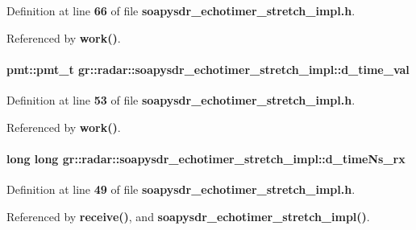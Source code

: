 Definition at line {\bf 66} of file {\bf soapysdr\+\_\+echotimer\+\_\+stretch\+\_\+impl.\+h}.



Referenced by {\bf work()}.

\paragraph[{d\+\_\+time\+\_\+val}]{\setlength{\rightskip}{0pt plus 5cm}pmt\+::pmt\+\_\+t gr\+::radar\+::soapysdr\+\_\+echotimer\+\_\+stretch\+\_\+impl\+::d\+\_\+time\+\_\+val\hspace{0.3cm}{\ttfamily [private]}}\label{classgr_1_1radar_1_1soapysdr__echotimer__stretch__impl_aaed45138f620b093a0f0569e5e1b20b2}


Definition at line {\bf 53} of file {\bf soapysdr\+\_\+echotimer\+\_\+stretch\+\_\+impl.\+h}.



Referenced by {\bf work()}.

\paragraph[{d\+\_\+time\+Ns\+\_\+rx}]{\setlength{\rightskip}{0pt plus 5cm}long long gr\+::radar\+::soapysdr\+\_\+echotimer\+\_\+stretch\+\_\+impl\+::d\+\_\+time\+Ns\+\_\+rx\hspace{0.3cm}{\ttfamily [private]}}\label{classgr_1_1radar_1_1soapysdr__echotimer__stretch__impl_a0435d6de77baf82bf6cf5c22a843df48}


Definition at line {\bf 49} of file {\bf soapysdr\+\_\+echotimer\+\_\+stretch\+\_\+impl.\+h}.



Referenced by {\bf receive()}, and {\bf soapysdr\+\_\+echotimer\+\_\+stretch\+\_\+impl()}.

